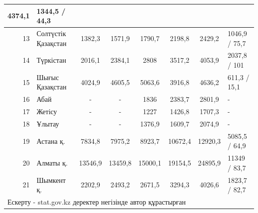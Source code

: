 \begin{table}[H]
{\begin{tabular}{|rlcccccl|}
    \multicolumn{1}{c|}{4374,1} &
    1344,5 / 44,3 \\ \hline
  \multicolumn{1}{|r|}{13} &
    \multicolumn{1}{l|}{Солтүстік Қазақстан} &
    \multicolumn{1}{c|}{1382,3} &
    \multicolumn{1}{c|}{1571,9} &
    \multicolumn{1}{c|}{1790,7} &
    \multicolumn{1}{c|}{2198,8} &
    \multicolumn{1}{c|}{2429,2} &
    1046,9 / 75,7 \\ \hline
  \multicolumn{1}{|r|}{14} &
    \multicolumn{1}{l|}{Түркістан} &
    \multicolumn{1}{c|}{2016,1} &
    \multicolumn{1}{c|}{2384,1} &
    \multicolumn{1}{c|}{2808} &
    \multicolumn{1}{c|}{3517,2} &
    \multicolumn{1}{c|}{4053,9} &
    2037,8 / 101 \\ \hline
  \multicolumn{1}{|r|}{15} &
    \multicolumn{1}{l|}{Шығыс Қазақстан} &
    \multicolumn{1}{c|}{4024,9} &
    \multicolumn{1}{c|}{4605,5} &
    \multicolumn{1}{c|}{5063,6} &
    \multicolumn{1}{c|}{3916,8} &
    \multicolumn{1}{c|}{4636,2} &
    611,3 / 15,1 \\ \hline
  \multicolumn{1}{|r|}{16} &
    \multicolumn{1}{l|}{Абай} &
    \multicolumn{1}{c|}{-} &
    \multicolumn{1}{c|}{-} &
    \multicolumn{1}{c|}{1836} &
    \multicolumn{1}{c|}{2383,7} &
    \multicolumn{1}{c|}{2801,9} &
    - \\ \hline
  \multicolumn{1}{|r|}{17} &
    \multicolumn{1}{l|}{Жетісу} &
    \multicolumn{1}{c|}{-} &
    \multicolumn{1}{c|}{-} &
    \multicolumn{1}{c|}{1227} &
    \multicolumn{1}{c|}{1426,8} &
    \multicolumn{1}{c|}{1707,3} &
    - \\ \hline
  \multicolumn{1}{|r|}{18} &
    \multicolumn{1}{l|}{Ұлытау} &
    \multicolumn{1}{c|}{-} &
    \multicolumn{1}{c|}{-} &
    \multicolumn{1}{c|}{1376,9} &
    \multicolumn{1}{c|}{1609,7} &
    \multicolumn{1}{c|}{2074,9} &
    - \\ \hline
  \multicolumn{1}{|r|}{19} &
    \multicolumn{1}{l|}{Астана қ.} &
    \multicolumn{1}{c|}{7834,8} &
    \multicolumn{1}{c|}{7975,2} &
    \multicolumn{1}{c|}{8923,7} &
    \multicolumn{1}{c|}{10672,4} &
    \multicolumn{1}{c|}{12920,3} &
    5085,5 / 64,9 \\ \hline
  \multicolumn{1}{|r|}{20} &
    \multicolumn{1}{l|}{Алматы қ.} &
    \multicolumn{1}{c|}{13546,9} &
    \multicolumn{1}{c|}{13459,8} &
    \multicolumn{1}{c|}{15000,1} &
    \multicolumn{1}{c|}{19154,5} &
    \multicolumn{1}{c|}{24895,9} &
    11349 / 83,7 \\ \hline
  \multicolumn{1}{|r|}{21} &
    \multicolumn{1}{l|}{Шымкент қ.} &
    \multicolumn{1}{c|}{2202,9} &
    \multicolumn{1}{c|}{2493,2} &
    \multicolumn{1}{c|}{2671,5} &
    \multicolumn{1}{c|}{3294,3} &
    \multicolumn{1}{c|}{4026,6} &
    1823,7 / 82,7 \\ \hline
  \multicolumn{8}{|l|}{Ескерту - stat.gov.kz деректер негізінде автор құрастырған} \\ \hline
  \end{tabular}%
  }
  \end{table}

